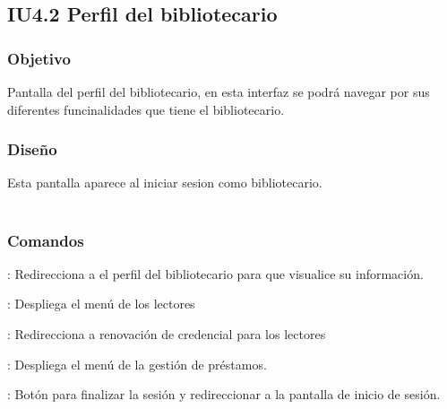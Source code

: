 \newpage
\subsection{IU4.2 Perfil del bibliotecario}

\subsubsection{Objetivo}
	Pantalla del perfil del bibliotecario, en esta interfaz se podrá navegar por sus diferentes funcinalidades que tiene el bibliotecario.  

\subsubsection{Diseño}
	Esta pantalla aparece al iniciar sesion como bibliotecario.  \\\\



\subsubsection{Comandos}
	\begin{Citemize}
		\item {}: Redirecciona a el perfil del bibliotecario para que visualice su información. 
		\item {}: Despliega el menú de los lectores
		\item {}: Redirecciona a renovación de credencial para los lectores
		\item {}: Despliega el menú de la gestión de préstamos. 
		\item {}: Botón para finalizar la sesión y redireccionar a la pantalla de inicio de sesión.
	\end{Citemize}